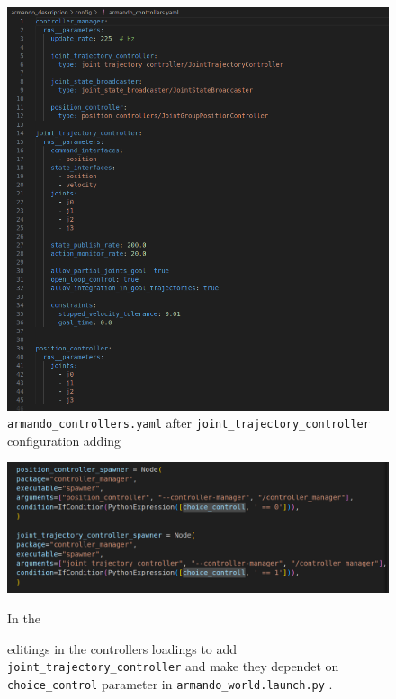 \documentclass{article}
\begin{document}
\begin{enumerate}
\begin{figure}[H] %
  \centering
  \includegraphics[width=1\textwidth]{Images/4D_2.png} %
  \caption{\texttt{armando\_controllers.yaml} after \texttt{joint\_trajectory\_controller} configuration adding } %
  \label{fig:publishCommand}
\end{figure}
\begin{figure}[H] %
  \centering
  \includegraphics[width=1\textwidth]{Images/4D_3.png} %
  \caption{editings in the controllers loadings to add \texttt{joint\_trajectory\_controller} and make they dependet on \texttt{choice\_control} parameter in  \texttt{armando\_world.launch.py}  .} %
  \label{fig:publishCommand}
In the 


\end{figure}
\end{enumerate}
\end{document}
